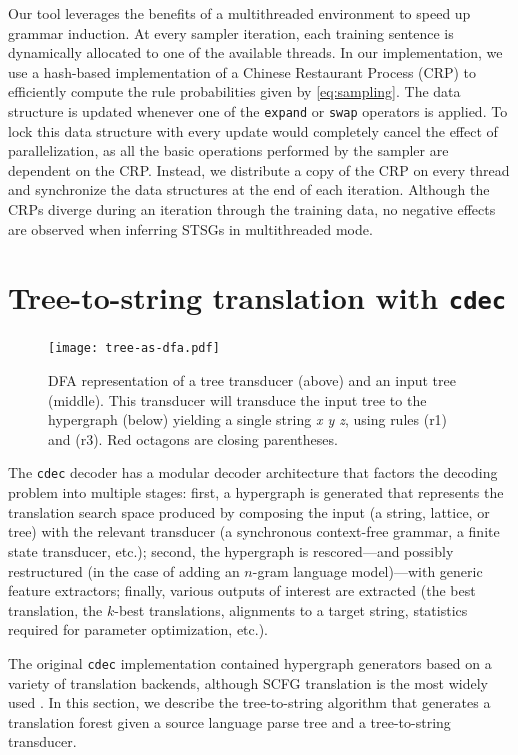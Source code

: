 \documentclass[nofonts]{pbml} %
\begin{document}
Our tool leverages the benefits of a multithreaded environment to speed up grammar induction. At every sampler iteration, each training sentence is dynamically allocated to one of the available threads. In our implementation, we use a hash-based implementation of a Chinese Restaurant Process (CRP) \citep{Teh2010} to efficiently compute the rule probabilities given by \autoref{eq:sampling}. The data structure is updated whenever one of the \texttt{expand} or \texttt{swap} operators is applied. To lock this data structure with every update would completely cancel the effect of parallelization, as all the basic operations performed by the sampler are dependent on the CRP. Instead, we distribute a copy of the CRP on every thread and synchronize the data structures at the end of each iteration. Although the CRPs diverge during an iteration through the training data, no negative effects are observed when inferring STSGs in multithreaded mode.

\section{Tree-to-string translation with {\tt cdec}}
\label{sec:cdec}

\begin{figure}[th!]
\centering
\texttt{[image: tree-as-dfa.pdf]}
\caption{\label{fig:det}DFA representation of a tree transducer (above) and an input tree (middle). This transducer will transduce the input tree to the hypergraph (below) yielding a single string \emph{x y z}, using rules (r1) and (r3). Red octagons are closing parentheses.}
\end{figure}

The {\tt cdec} decoder \citep{Dyer_etal_2010} has a modular decoder architecture that factors the decoding problem into multiple stages: first, a hypergraph is generated that represents the translation search space produced by composing the input (a string, lattice, or tree) with the relevant transducer (a synchronous context-free grammar, a finite state transducer, etc.); second, the hypergraph is rescored---and possibly restructured (in the case of adding an $n$-gram language model)---with generic feature extractors; finally, various outputs of interest are extracted (the best translation, the $k$-best translations, alignments to a target string, statistics required for parameter optimization, etc.).

The original {\tt cdec} implementation contained hypergraph generators based on a variety of translation backends, although SCFG translation is the most widely used \citep{chiang:2007}. In this section, we describe the tree-to-string algorithm that generates a translation forest given a source language parse tree and a tree-to-string transducer.
\end{document}
